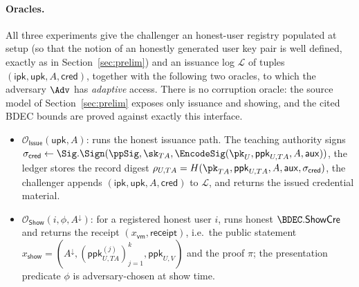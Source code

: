 \paragraph{Oracles.}
All three experiments give the challenger an honest-user registry populated at setup (so that the
notion of an honestly generated user key pair is well defined, exactly as in
Section~\ref{sec:prelim}) and an issuance log $\mathcal L$ of tuples
$(\mathsf{ipk},\mathsf{upk},A,\mathsf{cred})$, together with the following two oracles, to which the
adversary $\Adv$ has \emph{adaptive} access. There is no corruption oracle: the source model of
Section~\ref{sec:prelim} exposes only issuance and showing, and the cited BDEC bounds are proved
against exactly this interface.
\begin{itemize}
\item $\mathcal O_{\mathsf{Issue}}(\mathsf{upk},A)$: runs the honest issuance path. The teaching
authority signs
$\sigma_{\mathsf{cred}}\leftarrow\Sig.\Sign(\ppSig,\sk_{TA},\EncodeSig(\pk_U,\mathsf{ppk}_{U,TA},A,\mathsf{aux}))$,
the ledger stores the record digest
$\rho_{U,TA}=H(\pk_{TA},\mathsf{ppk}_{U,TA},A,\mathsf{aux},\sigma_{\mathsf{cred}})$, the challenger
appends $(\mathsf{ipk},\mathsf{upk},A,\mathsf{cred})$ to $\mathcal L$, and returns the issued
credential material.
\item $\mathcal O_{\mathsf{Show}}(i,\phi,A^\downarrow)$: for a registered honest user $i$, runs
honest $\BDEC.\mathsf{ShowCre}$ and returns the receipt $(x_{\mathsf{vm}},\mathsf{receipt})$, i.e.\ the
public statement
$x_{\mathsf{show}}=(A^\downarrow,(\mathsf{ppk}_{U,TA}^{(j)})_{j=1}^{k},\mathsf{ppk}_{U,V})$ and the proof
$\pi$; the presentation predicate $\phi$ is adversary-chosen at show time.
\end{itemize}


